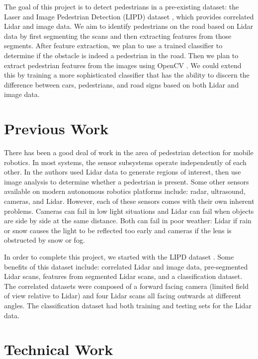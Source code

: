 \documentclass[10pt,twocolumn,letterpaper]{article}
\begin{document}
  The goal of this project is to detect pedestrians in a pre-existing dataset:
  the Laser and Image Pedestrian Detection (LIPD) dataset \cite{dataset},
  which provides correlated Lidar and image data. We aim to identify pedestrians
  on the road based on Lidar data by first segmenting the scans and then 
  extracting features from those segments.
  After feature extraction, we plan to use a trained classifier to determine
  if the obstacle is indeed a pedestrian in the road. Then we plan to extract
  pedestrian features from the images using OpenCV \cite{opencv}. We could extend this by
  training a more sophisticated classifier that has the ability to discern the
  difference between cars, pedestrians, and road signs based on both Lidar
  and image data.

\section{Previous Work}

  There has been a good deal of work in the area of pedestrian detection for
  mobile robotics. In most systems, the sensor subsystems operate independently
  of each other. In \cite{journal} the authors used Lidar data to generate regions
  of interest, then use image analysis to determine whether a pedestrian is
  present. Some other sensors available on modern autonomous robotics
  platforms include: radar, ultrasound, cameras, and Lidar. However, 
  each of these sensors comes with their own
  inherent problems. Cameras can fail in low light situations and Lidar can
  fail when objects are side by side at the same distance. Both can fail in poor
  weather: Lidar if rain or snow causes the light to be reflected
  too early and cameras if the lens is obstructed by snow or fog.

  In order to complete this project, we started with the LIPD dataset \cite{dataset}.
  Some benefits of this dataset include: correlated Lidar and image data, pre-segmented
  Lidar scans, features from segmented Lidar scans, and
  a classification dataset. The correlated datasets were composed of a forward
  facing camera (limited field of view relative to Lidar) and four Lidar scans
  all facing outwards at different angles. The classification dataset had both
  training and testing sets for the Lidar data.


\section{Technical Work}
\end{document}
